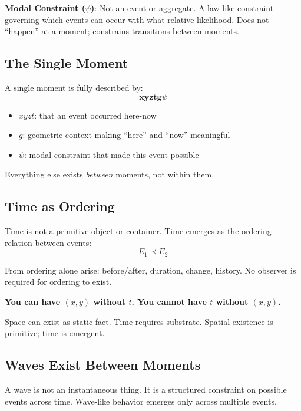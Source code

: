 \documentclass[aps,prl,twocolumn,showpacs,superscriptaddress,groupedaddress]{revtex4-2}
\begin{document}
\textbf{Modal Constraint ($\psi$)}: Not an event or aggregate. A law-like constraint governing which events can occur with what relative likelihood. Does not ``happen'' at a moment; constrains transitions between moments.

\subsection{The Single Moment}

A single moment is fully described by:
\begin{equation}
\textbf{xyztg}\psi
\end{equation}

\begin{itemize}
\item $xyzt$: that an event occurred here-now
\item $g$: geometric context making ``here'' and ``now'' meaningful
\item $\psi$: modal constraint that made this event possible
\end{itemize}

Everything else exists \textit{between} moments, not within them.

\subsection{Time as Ordering}

Time is not a primitive object or container. Time emerges as the ordering relation between events:
\begin{equation}
E_1 \prec E_2
\end{equation}

From ordering alone arise: before/after, duration, change, history. No observer is required for ordering to exist.

\textbf{You can have $(x,y)$ without $t$. You cannot have $t$ without $(x,y)$.}

Space can exist as static fact. Time requires substrate. Spatial existence is primitive; time is emergent.

\subsection{Waves Exist Between Moments}

A wave is not an instantaneous thing. It is a structured constraint on possible events across time. Wave-like behavior emerges only across multiple events.
\end{document}

